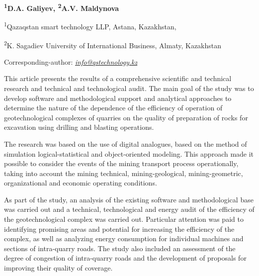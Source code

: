 
\begin{articleheader}

{\bfseries
\textsuperscript{1}D.A. Galiyev,
\textsuperscript{2}A.V. Maldynova
}
\end{articleheader}

\begin{affiliation}
\textsuperscript{1}Qazaqstan smart technology LLP, Astana, Kazakhstan,

\textsuperscript{2}K. Sagadiev University of International Business, Almaty, Kazakhstan

\raggedright \textsuperscript{\envelope }Corresponding-author: \href{mailto:info@qstechnology.kz}{\emph{info@qstechnology.kz}}
\end{affiliation}

This article presents the results of a comprehensive scientific and
technical research and technical and technological audit. The main goal
of the study was to develop software and methodological support and
analytical approaches to determine the nature of the dependence of the
efficiency of operation of geotechnological complexes of quarries on the
quality of preparation of rocks for excavation using drilling and
blasting operations.

The research was based on the use of digital analogues, based on the
method of simulation logical-statistical and object-oriented modeling.
This approach made it possible to consider the events of the mining
transport process operationally, taking into account the mining
technical, mining-geological, mining-geometric, organizational and
economic operating conditions.

As part of the study, an analysis of the existing software and
methodological base was carried out and a technical, technological and
energy audit of the efficiency of the geotechnological complex was
carried out. Particular attention was paid to identifying promising
areas and potential for increasing the efficiency of the complex, as
well as analyzing energy consumption for individual machines and
sections of intra-quarry roads. The study also included an assessment of
the degree of congestion of intra-quarry roads and the development of
proposals for improving their quality of coverage.

